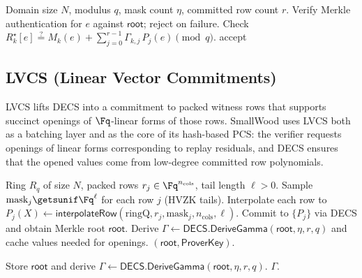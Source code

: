 \begin{algorithm}[H]
\caption{\textsf{DECS.VerifyEval}(\(\mathsf{root},\Gamma,R,\mathsf{open}\)) (verifier)}
\label{alg:decs-verifyeval}
\begin{algorithmic}[1]
\Require Domain size \(N\), modulus \(q\), mask count \(\eta\), committed row count \(r\).
  \State Verify Merkle authentication for \(e\) against \(\mathsf{root}\); reject on failure.
    \State Check \(R_k^\star[e] \stackrel{?}{=} M_k(e) + \sum_{j=0}^{r-1}\Gamma_{k,j}\,P_j(e)\pmod q\).
  \EndFor
\EndFor
\State \Return accept
\end{algorithmic}
\end{algorithm}

\subsection{LVCS (Linear Vector Commitments)}
LVCS lifts DECS into a commitment to packed witness rows that supports succinct
openings of \(\Fq\)-linear forms of those rows. SmallWood uses LVCS both as a
batching layer and as the core of its hash-based PCS: the verifier requests
openings of linear forms corresponding to replay residuals, and DECS ensures
that the opened values come from low-degree committed row polynomials.

\begin{algorithm}[H]
\caption{\textsf{LVCS.CommitInitWithParams}(\(\mathrm{ringQ},\{r_j\}_{j<r},\ell,\mathrm{params}\)) \(\to (\mathsf{root},\mathsf{ProverKey})\) (prover)}
\label{alg:lvcs-commitinit}
\begin{algorithmic}[1]
\Require Ring \(R_q\) of size \(N\), packed rows \(r_j\in\Fq^{n_{\mathrm{cols}}}\), tail length \(\ell>0\).
\State Sample \(\mathrm{mask}_j\getsunif \Fq^{\ell}\) for each row \(j\) (HVZK tails).
\State Interpolate each row to \(P_j(X)\gets \textsf{interpolateRow}(\mathrm{ringQ},r_j,\mathrm{mask}_j,n_{\mathrm{cols}},\ell)\).
\State Commit to \(\{P_j\}\) via DECS and obtain Merkle root \(\mathsf{root}\).
\State Derive \(\Gamma\gets \textsf{DECS.DeriveGamma}(\mathsf{root},\eta,r,q)\) and cache values needed for openings.
\State \Return \((\mathsf{root},\mathsf{ProverKey})\).
\end{algorithmic}
\end{algorithm}

\begin{algorithm}[H]
\caption{\textsf{LVCS.CommitStep1}(\(\mathsf{root}\)) \(\to \Gamma\) (verifier)}
\label{alg:lvcs-commitstep1}
\begin{algorithmic}[1]
\State Store \(\mathsf{root}\) and derive \(\Gamma\gets \textsf{DECS.DeriveGamma}(\mathsf{root},\eta,r,q)\).
\State \Return \(\Gamma\).
\end{algorithmic}
\end{algorithm}

